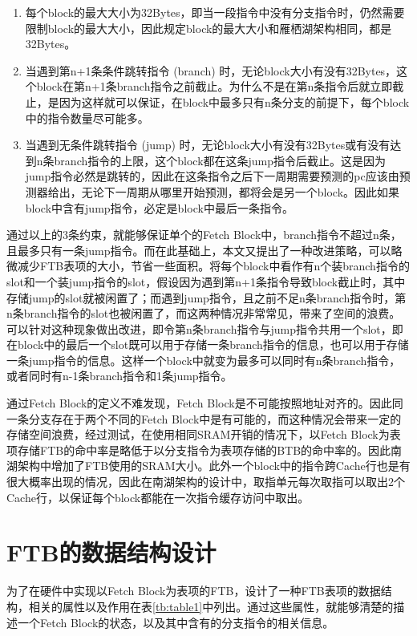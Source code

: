 \begin{enumerate}
    \item 每个block的最大大小为32Bytes，即当一段指令中没有分支指令时，仍然需要限制block的最大大小，因此规定block的最大大小和雁栖湖架构相同，都是32Bytes。
    \item 当遇到第n+1条条件跳转指令 (branch) 时，无论block大小有没有32Bytes，这个block在第n+1条branch指令之前截止。为什么不是在第n条指令后就立即截止，是因为这样就可以保证，在block中最多只有n条分支的前提下，每个block中的指令数量尽可能多。
    \item 当遇到无条件跳转指令 (jump) 时，无论block大小有没有32Bytes或有没有达到n条branch指令的上限，这个block都在这条jump指令后截止。这是因为jump指令必然是跳转的，因此在这条指令之后下一周期需要预测的pc应该由预测器给出，无论下一周期从哪里开始预测，都将会是另一个block。因此如果block中含有jump指令，必定是block中最后一条指令。
\end{enumerate}

通过以上的3条约束，就能够保证单个的Fetch Block中，branch指令不超过n条，且最多只有一条jump指令。而在此基础上，本文又提出了一种改进策略，可以略微减少FTB表项的大小，节省一些面积。将每个block中看作有n个装branch指令的slot和一个装jump指令的slot，假设因为遇到第n+1条指令导致block截止时，其中存储jump的slot就被闲置了；而遇到jump指令，且之前不足n条branch指令时，第n条branch指令的slot也被闲置了，而这两种情况非常常见，带来了空间的浪费。可以针对这种现象做出改进，即令第n条branch指令与jump指令共用一个slot，即在block中的最后一个slot既可以用于存储一条branch指令的信息，也可以用于存储一条jump指令的信息。这样一个block中就变为最多可以同时有n条branch指令，或者同时有n-1条branch指令和1条jump指令。

通过Fetch Block的定义不难发现，Fetch Block是不可能按照地址对齐的。因此同一条分支存在于两个不同的Fetch Block中是有可能的，而这种情况会带来一定的存储空间浪费，经过测试，在使用相同SRAM开销的情况下，以Fetch Block为表项存储FTB的命中率是略低于以分支指令为表项存储的BTB的命中率的。因此南湖架构中增加了FTB使用的SRAM大小。此外一个block中的指令跨Cache行也是有很大概率出现的情况，因此在南湖架构的设计中，取指单元每次取指可以取出2个Cache行，以保证每个block都能在一次指令缓存访问中取出。

\section{FTB的数据结构设计}


为了在硬件中实现以Fetch Block为表项的FTB，设计了一种FTB表项的数据结构，相关的属性以及作用在表\ref{tb:table1}中列出。通过这些属性，就能够清楚的描述一个Fetch Block的状态，以及其中含有的分支指令的相关信息。


